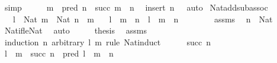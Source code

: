 \begin{isabellebody}
\ simp\isanewline
\ \ \isamarkupfalse%
\ \isamarkupfalse%
\ {\isachardoublequoteopen}m\ {\isacharminus}{\kern0pt}\ pred\ n\ {\isacharequal}{\kern0pt}\ succ\ {\isacharparenleft}{\kern0pt}m\ {\isacharminus}{\kern0pt}\ n{\isacharparenright}{\kern0pt}{\isachardoublequoteclose}\ \isacommand{{\isachardot}{\kern0pt}}\isamarkupfalse%
\isanewline
{}\isamarkupfalse%
\ {\isacharparenleft}{\kern0pt}insert\ {\isacartoucheopen}n\ {\isasymnoteq}\ {}{\isacartoucheclose}{\isacharcomma}{\kern0pt}\ auto{\isacharparenright}{\kern0pt}%
\endisatagproof
{\isafoldproof}%
%
\isadelimproof
\isanewline
%
\endisadelimproof
\isanewline
{}\isamarkupfalse%
\ Nat{\isacharunderscore}{\kern0pt}add{\isacharunderscore}{\kern0pt}sub{\isacharunderscore}{\kern0pt}assoc{\isacharcolon}{\kern0pt}\isanewline
\ \ \ {\isachardoublequoteopen}l\ {\isacharcolon}{\kern0pt}\ Nat{\isachardoublequoteclose}\ {\isachardoublequoteopen}m\ {\isacharcolon}{\kern0pt}\ Nat{\isachardoublequoteclose}\ {\isachardoublequoteopen}n\ {\isasymle}\ m{\isachardoublequoteclose}\isanewline
\ \ \ {\isachardoublequoteopen}l\ {\isacharplus}{\kern0pt}\ m\ {\isacharminus}{\kern0pt}\ n\ {\isacharequal}{\kern0pt}\ l\ {\isacharplus}{\kern0pt}\ {\isacharparenleft}{\kern0pt}m\ {\isacharminus}{\kern0pt}\ n{\isacharparenright}{\kern0pt}{\isachardoublequoteclose}\isanewline
%
\isadelimproof
%
\endisadelimproof
%
\isatagproof
{}\isamarkupfalse%
\ {\isacharminus}{\kern0pt}\isanewline
\ \ \isanewline
\ \ \isamarkupfalse%
\ assms\ \isamarkupfalse%
\ {\isachardoublequoteopen}n\ {\isacharcolon}{\kern0pt}\ Nat{\isachardoublequoteclose}\ \isamarkupfalse%
\ Nat{\isacharunderscore}{\kern0pt}if{\isacharunderscore}{\kern0pt}le{\isacharunderscore}{\kern0pt}Nat\ \isamarkupfalse%
\ auto\isanewline
\ \ \isamarkupfalse%
\ \isamarkupfalse%
\ {\isachardoublequoteopen}{\isacharquery}{\kern0pt}thesis{\isachardoublequoteclose}\ \isamarkupfalse%
\ assms\isanewline
\ \ \isamarkupfalse%
\ {\isacharparenleft}{\kern0pt}induction\ n\ arbitrary{\isacharcolon}{\kern0pt}\ l\ m\ rule{\isacharcolon}{\kern0pt}\ Nat{\isacharunderscore}{\kern0pt}induct{\isacharparenright}{\kern0pt}\isanewline
\ \ \ \ \isamarkupfalse%
\ {\isacharparenleft}{\kern0pt}succ\ n{\isacharparenright}{\kern0pt}\isanewline
\ \ \ \ \isamarkupfalse%
\ {\isachardoublequoteopen}l\ {\isacharplus}{\kern0pt}\ m\ {\isacharminus}{\kern0pt}\ succ\ n\ {\isacharequal}{\kern0pt}\ pred\ {\isacharparenleft}{\kern0pt}l\ {\isacharplus}{\kern0pt}\ m\ {\isacharminus}{\kern0pt}\ n{\isacharparenright}{\kern0pt}{\isachardoublequoteclose}\ \isamarkupfalse%

\end{isabellebody}
